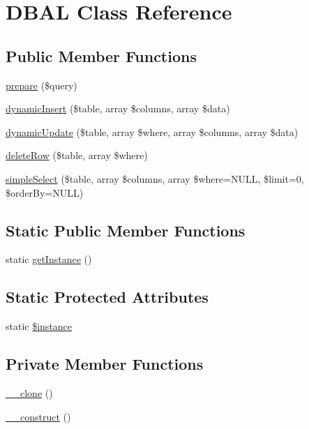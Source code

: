 \hypertarget{a00022}{}\section{D\+B\+A\+L Class Reference}
\label{a00022}
\subsection*{Public Member Functions}
\begin{DoxyCompactItemize}
\item 
\hyperlink{a00022_a008a39a69d47048bd395c3c63c529ed5}{prepare} (\$query)
\item 
\hyperlink{a00022_a95860e8df75ae87cb665e6f6f6d00016}{dynamic\+Insert} (\$table, array \$columns, array \$data)
\item 
\hyperlink{a00022_ac55b38f92f3f092e60b00ecf0ac56d2d}{dynamic\+Update} (\$table, array \$where, array \$columns, array \$data)
\item 
\hyperlink{a00022_a1c2972b596a6b8923bd8930301e165f5}{delete\+Row} (\$table, array \$where)
\item 
\hyperlink{a00022_af9b4977008273145eb78c0746bcd07bc}{simple\+Select} (\$table, array \$columns, array \$where=N\+U\+L\+L, \$limit=0, \$order\+By=N\+U\+L\+L)
\end{DoxyCompactItemize}
\subsection*{Static Public Member Functions}
\begin{DoxyCompactItemize}
\item 
static \hyperlink{a00022_ac93fbec81f07e5d15f80db907e63dc10}{get\+Instance} ()
\end{DoxyCompactItemize}
\subsection*{Static Protected Attributes}
\begin{DoxyCompactItemize}
\item 
static \hyperlink{a00022_ad9d7ce33ebb142b70e58b68052ca0ea8}{\$instance}
\end{DoxyCompactItemize}
\subsection*{Private Member Functions}
\begin{DoxyCompactItemize}
\item 
\hyperlink{a00022_ad0cb87b388bc74d63dc884accdca8713}{\+\_\+\+\_\+clone} ()
\item 
\hyperlink{a00022_a095c5d389db211932136b53f25f39685}{\+\_\+\+\_\+construct} ()
\end{DoxyCompactItemize}


